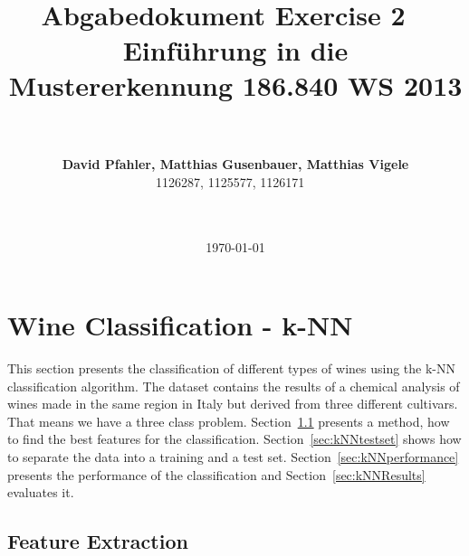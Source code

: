 \documentclass[a4paper,psfig,subfigure,epsfig,fleqn,amssmb,float,caption,fontenc,ausarbeitung]{article}
\begin{document}
\date{\today}

\title{~\\
  ~\\
  \fontsize{14}{14pt} \bf Abgabedokument Exercise 2
	 ~\\
  \fontsize{12}{12pt} \bf Einführung in die Mustererkennung 186.840 WS 2013}

\author{~\\
  ~\\
  \fontsize{12}{12pt}
  {\bf David Pfahler, Matthias Gusenbauer, Matthias Vigele}\\
  1126287, 1125577, 1126171
  ~\\ ~\\ ~\\
  \normalsize
}

\maketitle
\normalfont
\thispagestyle{empty}


\section{Wine Classification - k-NN}
\label{sec:kNN}

This section presents the classification of different types of wines using 
the k-NN classification algorithm. The dataset\cite{data} contains the results of a 
chemical analysis of wines made in the same region in Italy but derived from 
three different cultivars. That means we have a three class problem. 
Section~\ref{sec:features} presents a method, how to find the best features 
for the classification. Section~\ref{sec:kNNtestset} shows how to separate 
the data into a training and a test set. Section~\ref{sec:kNNperformance} 
presents the performance of the classification and Section~\ref{sec:kNNResults}
evaluates it.


\subsection{Feature Extraction}
\label{sec:features}
\end{document}
